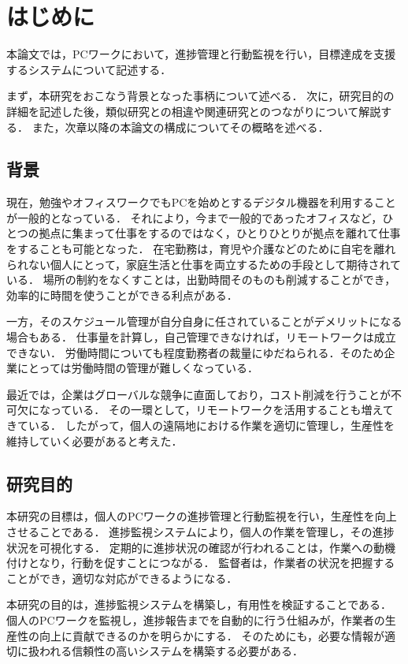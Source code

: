 \chapter{はじめに}
本論文では，PCワークにおいて，進捗管理と行動監視を行い，目標達成を支援するシステムについて記述する．

まず，本研究をおこなう背景となった事柄について述べる．
次に，研究目的の詳細を記述した後，類似研究との相違や関連研究とのつながりについて解説する．
また，次章以降の本論文の構成についてその概略を述べる．

\section{背景}
現在，勉強やオフィスワークでもPCを始めとするデジタル機器を利用することが一般的となっている．
それにより，今まで一般的であったオフィスなど，ひとつの拠点に集まって仕事をするのではなく，ひとりひとりが拠点を離れて仕事をすることも可能となった．
在宅勤務は，育児や介護などのために自宅を離れられない個人にとって，家庭生活と仕事を両立するための手段として期待されている．
場所の制約をなくすことは，出勤時間そのものも削減することができ，効率的に時間を使うことができる利点がある．

一方，そのスケジュール管理が自分自身に任されていることがデメリットになる場合もある．
仕事量を計算し，自己管理できなければ，リモートワークは成立できない．
労働時間についても程度勤務者の裁量にゆだねられる．そのため企業にとっては労働時間の管理が難しくなっている．

最近では，企業はグローバルな競争に直面しており，コスト削減を行うことが不可欠になっている．
その一環として，リモートワークを活用することも増えてきている．
したがって，個人の遠隔地における作業を適切に管理し，生産性を維持していく必要があると考えた．

\section{研究目的}
本研究の目標は，個人のPCワークの進捗管理と行動監視を行い，生産性を向上させることである．
進捗監視システムにより，個人の作業を管理し，その進捗状況を可視化する．
定期的に進捗状況の確認が行われることは，作業への動機付けとなり，行動を促すことにつながる．
監督者は，作業者の状況を把握することができ，適切な対応ができるようになる．

本研究の目的は，進捗監視システムを構築し，有用性を検証することである．
個人のPCワークを監視し，進捗報告までを自動的に行う仕組みが，作業者の生産性の向上に貢献できるのかを明らかにする．
そのためにも，必要な情報が適切に扱われる信頼性の高いシステムを構築する必要がある．

